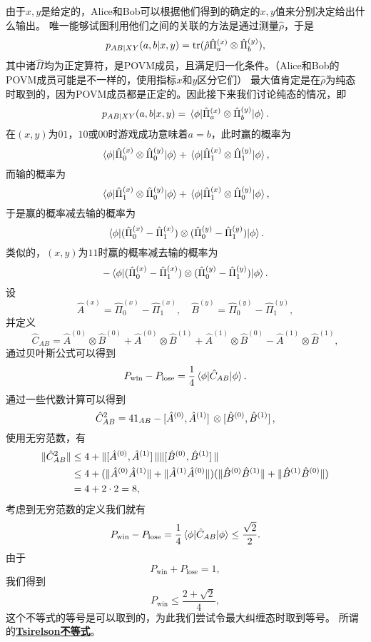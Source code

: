 \documentclass[hyperref, UTF8, a4paper]{ctexart}
\newcommand*{\concept}[1]{\underline{\textbf{#1}}}
\begin{document}
由于$x, y$是给定的，Alice和Bob可以根据他们得到的确定的$x, y$值来分别决定给出什么输出。
唯一能够试图利用他们之间的关联的方法是通过测量$\hat{\rho}$，于是
\[
    p_{AB|XY}(a, b | x, y) = \trace (\hat{\rho} \hat{\Pi}_{a}^{(x)} \otimes \hat{\Pi}_{b}^{(y)}),
\]
其中诸$\hat{\Pi}$均为正定算符，是POVM成员，且满足归一化条件。（Alice和Bob的POVM成员可能是不一样的，使用指标$x$和$y$区分它们）
最大值肯定是在$\hat{\rho}$为纯态时取到的，因为POVM成员都是正定的。因此接下来我们讨论纯态的情况，即
\[
    p_{AB|XY}(a, b | x, y) = \mel{\phi}{\hat{\Pi}_{a}^{(x)} \otimes \hat{\Pi}_{b}^{(y)}}{\phi}.
\]
在$(x, y)$为$01$，$10$或$00$时游戏成功意味着$a=b$，此时赢的概率为
\[
    \mel{\phi}{\hat{\Pi}^{(x)}_0 \otimes \hat{\Pi}^{(y)}_0}{\phi} + \mel{\phi}{\hat{\Pi}^{(x)}_1 \otimes \hat{\Pi}^{(y)}_1}{\phi},
\]
而输的概率为
\[
    \mel{\phi}{\hat{\Pi}^{(x)}_1 \otimes \hat{\Pi}^{(y)}_0}{\phi} + \mel{\phi}{\hat{\Pi}^{(x)}_1 \otimes \hat{\Pi}^{(y)}_0}{\phi},
\]
于是赢的概率减去输的概率为
\[
    \mel{\phi}{(\hat{\Pi}_0^{(x)} - \hat{\Pi}_1^{(x)}) \otimes (\hat{\Pi}_0^{(y)} - \hat{\Pi}_1^{(y)})}{\phi}.
\]
类似的，$(x, y)$为$11$时赢的概率减去输的概率为
\[
    - \mel{\phi}{(\hat{\Pi}_0^{(x)} - \hat{\Pi}_1^{(x)}) \otimes (\hat{\Pi}_0^{(y)} - \hat{\Pi}_1^{(y)})}{\phi}.
\]
设
\[
    \hat{A}^{(x)} = \hat{\Pi}^{(x)}_0 - \hat{\Pi}^{(x)}_1, \quad \hat{B}^{(y)} = \hat{\Pi}^{(y)}_0 - \hat{\Pi}^{(y)}_1,
\]
并定义
\[
    \hat{C}_{AB} = \hat{A}^{(0)} \otimes \hat{B}^{(0)} + \hat{A}^{(0)} \otimes \hat{B}^{(1)} + \hat{A}^{(1)} \otimes \hat{B}^{(0)} - \hat{A}^{(1)} \otimes \hat{B}^{(1)},
\]
通过贝叶斯公式可以得到
\[
    P_\text{win} - P_\text{lose} = \frac{1}{4} \mel{\phi}{\hat{C}_{AB}}{\phi}.
\]
通过一些代数计算可以得到
\[
    \hat{C}_{AB}^2 = 4 1_{AB} - \comm*{\hat{A}^{(0)}}{\hat{A}^{(1)}} \otimes \comm*{\hat{B}^{(0)}}{\hat{B}^{(1)}},
\]
使用无穷范数，有
\[
    \begin{aligned}
        \|\hat{C}_{AB}^2\| &\leq 4 + \|\comm*{\hat{A}^{(0)}}{\hat{A}^{(1)}}\| \|\comm*{\hat{B}^{(0)}}{\hat{B}^{(1)}}\| \\
        &\leq 4 + (\|\hat{A}^{(0)} \hat{A}^{(1)}\| + \|\hat{A}^{(1)} \hat{A}^{(0)}\|) (\|\hat{B}^{(0)} \hat{B}^{(1)}\| + \|\hat{B}^{(1)} \hat{B}^{(0)}\|) \\
        &= 4 + 2 \cdot 2 = 8,
    \end{aligned}
\]
考虑到无穷范数的定义我们就有
\[
    P_\text{win} - P_\text{lose} = \frac{1}{4} \mel{\phi}{\hat{C}_{AB}}{\phi} \leq \frac{\sqrt{2}}{2}.
\]
由于
\[
    P_\text{win} + P_\text{lose} = 1,
\]
我们得到
\begin{equation}
    P_\text{win} \leq \frac{2 + \sqrt{2}}{4},
\end{equation}
这个不等式的等号是可以取到的，为此我们尝试令最大纠缠态时取到等号。
所谓的\concept{Tsirelson不等式}。
\end{document}
